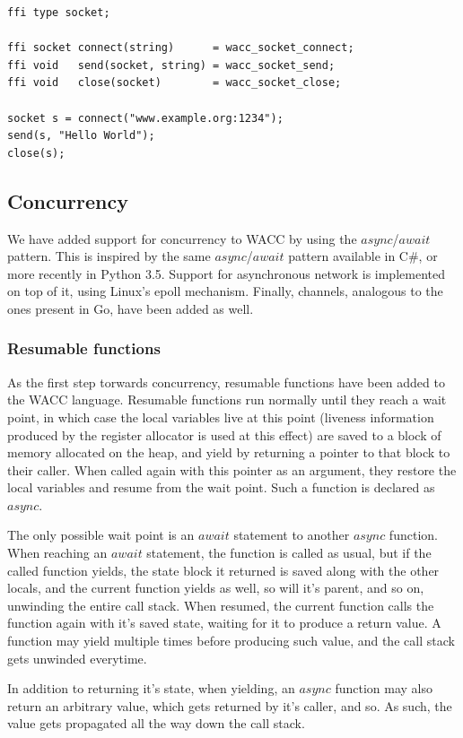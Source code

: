 \documentclass{article}
\begin{document}
\begin{lstlisting}
ffi type socket;

ffi socket connect(string)      = wacc_socket_connect;
ffi void   send(socket, string) = wacc_socket_send;
ffi void   close(socket)        = wacc_socket_close;

socket s = connect("www.example.org:1234");
send(s, "Hello World");
close(s);
\end{lstlisting}

\subsection{Concurrency}
We have added support for concurrency to WACC by using the $async$/$await$ pattern. This is inspired by the same
$async$/$await$ pattern available in C\#, or more recently in Python 3.5. Support for asynchronous network is
implemented on top of it, using Linux's epoll mechanism. Finally, channels, analogous to the ones present in Go,
have been added as well.

\subsubsection{Resumable functions}
As the first step torwards concurrency, resumable functions have been added to the WACC language.
Resumable functions run normally until they reach a wait point, in which case the local variables live at this point
(liveness information produced by the register allocator is used at this effect) are saved to a block of memory allocated
on the heap, and yield by returning a pointer to that block to their caller. When called again with this pointer as an argument,
they restore the local variables and resume from the wait point.
Such a function is declared as $async$.

The only possible wait point is an $await$ statement to another $async$ function. When reaching an $await$ statement,
the function is called as usual, but if the called function yields, the state block it returned is saved along with the
other locals, and the current function yields as well, so will it's parent, and so on, unwinding the entire call stack.
When resumed, the current function calls the function again with it's saved state, waiting for it to produce a return value.
A function may yield multiple times before producing such value, and the call stack gets unwinded everytime.

In addition to returning it's state, when yielding, an $async$ function may also return an arbitrary value, which gets
returned by it's caller, and so. As such, the value gets propagated all the way down the call stack.
\end{document}
